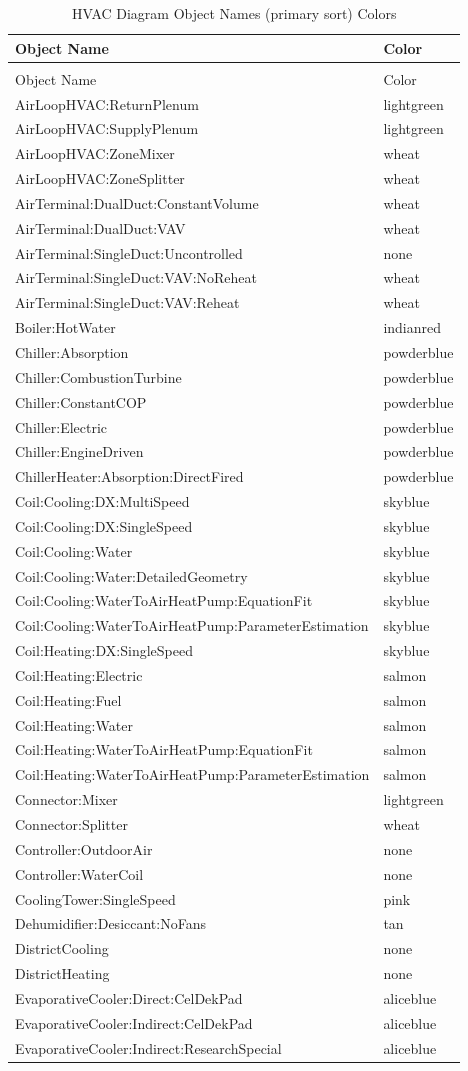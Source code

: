 \begin{longtable}[c]{@{}ll@{}}
\caption{HVAC Diagram Object Names (primary sort) Colors \label{table:hvac-diagram-object-names-primary-sort-colors}} \tabularnewline
\toprule
Object Name & Color \tabularnewline
\midrule
\endfirsthead

\caption[]{HVAC Diagram Object Names (primary sort) Colors} \tabularnewline
\toprule
Object Name & Color \tabularnewline
\midrule
\endhead

AirLoopHVAC:ReturnPlenum & lightgreen \tabularnewline
AirLoopHVAC:SupplyPlenum & lightgreen \tabularnewline
AirLoopHVAC:ZoneMixer & wheat \tabularnewline
AirLoopHVAC:ZoneSplitter & wheat \tabularnewline
AirTerminal:DualDuct:ConstantVolume & wheat \tabularnewline
AirTerminal:DualDuct:VAV & wheat \tabularnewline
AirTerminal:SingleDuct:Uncontrolled & none \tabularnewline
AirTerminal:SingleDuct:VAV:NoReheat & wheat \tabularnewline
AirTerminal:SingleDuct:VAV:Reheat & wheat \tabularnewline
Boiler:HotWater & indianred \tabularnewline
Chiller:Absorption & powderblue \tabularnewline
Chiller:CombustionTurbine & powderblue \tabularnewline
Chiller:ConstantCOP & powderblue \tabularnewline
Chiller:Electric & powderblue \tabularnewline
Chiller:EngineDriven & powderblue \tabularnewline
ChillerHeater:Absorption:DirectFired & powderblue \tabularnewline
Coil:Cooling:DX:MultiSpeed & skyblue \tabularnewline
Coil:Cooling:DX:SingleSpeed & skyblue \tabularnewline
Coil:Cooling:Water & skyblue \tabularnewline
Coil:Cooling:Water:DetailedGeometry & skyblue \tabularnewline
Coil:Cooling:WaterToAirHeatPump:EquationFit & skyblue \tabularnewline
Coil:Cooling:WaterToAirHeatPump:ParameterEstimation & skyblue \tabularnewline
Coil:Heating:DX:SingleSpeed & skyblue \tabularnewline
Coil:Heating:Electric & salmon \tabularnewline
Coil:Heating:Fuel & salmon \tabularnewline
Coil:Heating:Water & salmon \tabularnewline
Coil:Heating:WaterToAirHeatPump:EquationFit & salmon \tabularnewline
Coil:Heating:WaterToAirHeatPump:ParameterEstimation & salmon \tabularnewline
Connector:Mixer & lightgreen \tabularnewline
Connector:Splitter & wheat \tabularnewline
Controller:OutdoorAir & none \tabularnewline
Controller:WaterCoil & none \tabularnewline
CoolingTower:SingleSpeed & pink \tabularnewline
Dehumidifier:Desiccant:NoFans & tan \tabularnewline
DistrictCooling & none \tabularnewline
DistrictHeating & none \tabularnewline
EvaporativeCooler:Direct:CelDekPad & aliceblue \tabularnewline
EvaporativeCooler:Indirect:CelDekPad & aliceblue \tabularnewline
EvaporativeCooler:Indirect:ResearchSpecial & aliceblue \tabularnewline

\end{longtable}
